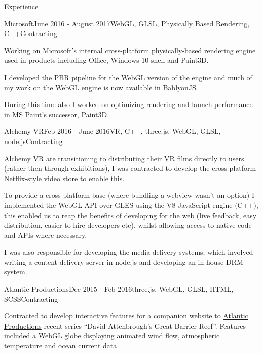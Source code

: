 \documentclass{resume} %
\begin{document}
\begin{rSection}{Experience}

\begin{rSubsection}{Microsoft}{June 2016 - August 2017}{WebGL, GLSL, Physically Based Rendering, C++}{Contracting}
\item Working on Microsoft's internal cross-platform physically-based rendering engine used in products including Office, Windows 10 shell and Paint3D.
\item I developed the PBR pipeline for the WebGL version of the engine and much of my work on the WebGL engine is now available in \href{https://www.babylonjs.com/demos/pbrglossy/}{BablyonJS}.
\item During this time also I worked on optimizing rendering and launch performance in MS Paint's successor, Paint3D.
\end{rSubsection}

\begin{rSubsection}{Alchemy VR}{Feb 2016 - June 2016}{VR, C++, three.js, WebGL, GLSL, node.js}{Contracting}
\item \href{http://www.alchemyvr.com/}{Alchemy VR} are transitioning to distributing their VR films directly to users (rather then through exhibitions), I was contracted to develop the cross-platform Netflix-style video store to enable this.
\item To provide a cross-platform base (where bundling a webview wasn't an option) I implemented the WebGL API over GLES using the V8 JavaScript engine (C++), this enabled us to reap the benefits of developing for the web (live feedback, easy distribution, easier to hire developers etc), whilst allowing access to native code and APIs where necessary.
\item I was also responsible for developing the media delivery systems, which involved writing a content delivery server in node.js and developing an in-house DRM system.
\end{rSubsection}

\begin{rSubsection}{Atlantic Productions}{Dec 2015 - Feb 2016}{three.js, WebGL, GLSL, HTML, SCSS}{Contracting}
\item Contracted to develop interactive features for a companion website to \href{http://www.atlanticproductions.tv/}{Atlantic Productions} recent series ``David Attenbrough's Great Barrier Reef''. Features included a \href{http://haxiomic.github.io/demos/webgl-earth-v4/}{WebGL globe displaying animated wind flow, atmospheric temperature and ocean current data}
\end{rSubsection}


\end{rSection}
\end{document}
